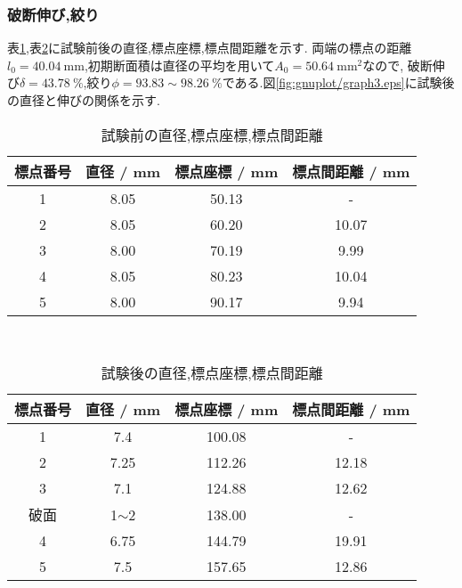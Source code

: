 \subsubsection{破断伸び,絞り}
表\ref{tab:res_al_pre},表\ref{tab:res_al_nex}に試験前後の直径,標点座標,標点間距離を示す.
両端の標点の距離$l_0=40.04~\si{\milli\metre}$,初期断面積は直径の平均を用いて$A_0=50.64~\si{\milli\metre^2}$なので,
破断伸び$\delta=43.78~\%$,絞り$\phi=93.83\sim98.26~\%$である.図\ref{fig:gnuplot/graph3.eps}に試験後の直径と伸びの関係を示す.
\begin{table}[htbp]
   \caption{試験前の直径,標点座標,標点間距離}
   \label{tab:res_al_pre}
   \centering
   \begin{tabular}{cccc}
     \hline
     標点番号&直径 / mm&標点座標 / mm&標点間距離 / mm\\
     \hline \hline
     1 & 8.05 & 50.13 & - \\
2 & 8.05 & 60.20 & 10.07  \\
3 & 8.00 & 70.19 & 9.99  \\
4 & 8.05 & 80.23 & 10.04  \\
5 & 8.00 & 90.17 & 9.94  \\
     \hline
   \end{tabular}
\end{table}\\
\begin{table}[htbp]
   \caption{試験後の直径,標点座標,標点間距離}
   \label{tab:res_al_nex}
   \centering
   \begin{tabular}{cccc}
     \hline
     標点番号&直径 / mm&標点座標 / mm&標点間距離 / mm\\
     \hline \hline
     1 & 7.4 & 100.08 & - \\
2 & 7.25 & 112.26 & 12.18 \\
3 & 7.1 & 124.88 & 12.62 \\
破面 & 1$\sim$2 & 138.00 & - \\
4 & 6.75 & 144.79 & 19.91 \\
5 & 7.5 & 157.65 & 12.86 \\
     \hline
   \end{tabular}
\end{table}
